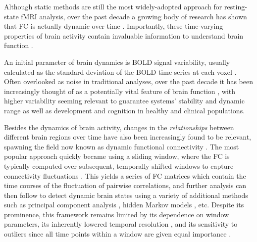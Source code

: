 Although static methods are still the most widely-adopted approach for resting-state fMRI analysis, over the past decade a growing body of research has shown that FC is actually dynamic over time \citep{Chang2010}. Importantly, these time-varying properties of brain activity contain invaluable information to understand brain function \citep{Hutchison2013, Christoff2016}.

An initial parameter of brain dynamics is BOLD signal variability, usually calculated as the standard deviation of the BOLD time series at each voxel \citep{McIntosh2010}. Often overlooked as noise in traditional analyses, over the past decade it has been increasingly thought of as a potentially vital feature of brain function \cite{Garrett2010}, with higher variability seeming relevant to guarantee systems' stability and dynamic range \citep{Deco2011} as well as development and cognition in healthy \citep{Garrett2013} and clinical \citep{Zoller2017, Nomi2018, Easson2019} populations.

Besides the dynamics of brain activity, changes in the \textit{relationships} between different brain regions over time have also been increasingly found to be relevant, spawning the field now known as dynamic functional connectivity \citep{Hutchison2013, Preti2017}. The most popular approach quickly became using a sliding window, where the FC is typically computed over subsequent, temporally shifted windows to capture connectivity fluctuations \citep{Chang2010, Sakoglu2010, Kucyi2014}. This yields a series of FC matrices which contain the time courses of the fluctuation of pairwise correlations, and further analysis can then follow to detect dynamic brain states using a variety of additional methods such as principal component analysis \citep{Leonardi2013}, hidden Markov models \citep{Vidaurre2017}, etc. Despite its prominence, this framework remains limited by its dependence on window parameters, its inherently lowered temporal resolution \cite{Leonardi2015}, and its sensitivity to outliers since all time points within a window are given equal importance \cite{Lindquist2014}.

